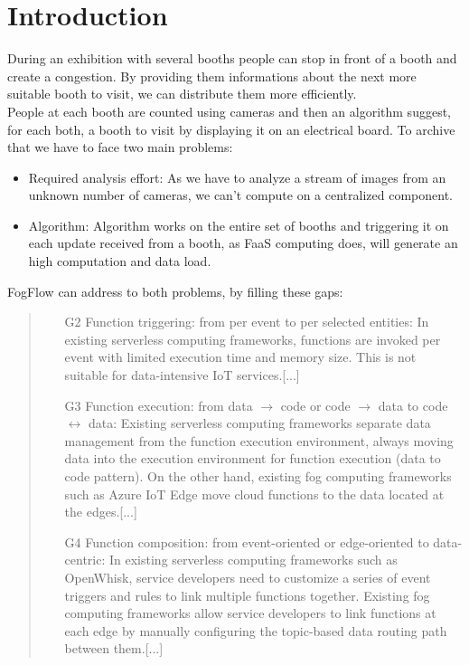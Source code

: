 \documentclass[conference]{ieeeconf}
\begin{document}
    \section{Introduction}
    During an exhibition with several booths people can stop in front of a booth and create a congestion. By providing them informations about the next more suitable booth to visit, we can distribute them more efficiently.\\
    People at each booth are counted using cameras and then an algorithm suggest, for each both, a booth to visit by displaying it on an electrical board.
    To archive that we have to face two main problems:
    \begin{itemize}
        \item Required analysis effort: As we have to analyze a stream of images from an unknown number of cameras, we can't compute on a centralized component.
        \item Algorithm: Algorithm works on the entire set of booths and triggering it on each update received from a booth, as FaaS computing does, will generate an high computation and data load.
    \end{itemize}{}
    FogFlow can address to both problems, by filling these gaps:\\
    \begin{quote}
        \begin{enumerate}
            \item[G2] Function triggering: from per event to per selected entities: In existing serverless computing frameworks, functions are invoked per event with limited execution time and memory size. This is not suitable for data-intensive IoT services.[...]
            \item[G3] Function execution: from data $\rightarrow$ code or code $\rightarrow$ data to code $\leftrightarrow$ data: Existing serverless computing frameworks separate data management from the function execution environment, always moving data into the execution environment for function execution (data to code pattern). On the other hand, existing fog computing frameworks such as Azure IoT Edge move cloud functions to the data located at the edges.[...]
            \item[G4] Function composition: from event-oriented or edge-oriented to data-centric:
            In existing serverless computing frameworks such as OpenWhisk, service developers need to customize a series of event triggers and rules to link multiple functions together. Existing fog computing frameworks allow service developers to link functions at each edge by manually configuring the topic-based data routing path between them.[...]
        \end{enumerate}{}
    \end{quote}~\cite{cheng2019fog}
\end{document}
